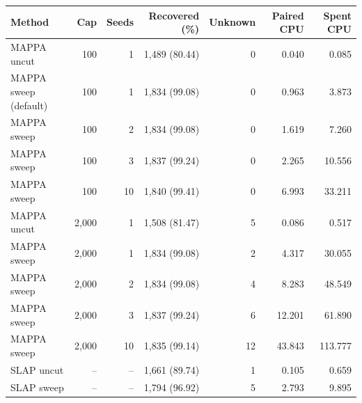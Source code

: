 \begin{tabular}{lrrr rrr}\toprule
Method & Cap & Seeds & Recovered (\%) & Unknown & Paired CPU & Spent CPU\\\midrule
MAPPA uncut & 100 & 1 & 1,489 (80.44) & 0 & 0.040 & 0.085\\
MAPPA sweep (default) & 100 & 1 & 1,834 (99.08) & 0 & 0.963 & 3.873\\
MAPPA sweep & 100 & 2 & 1,834 (99.08) & 0 & 1.619 & 7.260\\
MAPPA sweep & 100 & 3 & 1,837 (99.24) & 0 & 2.265 & 10.556\\
MAPPA sweep & 100 & 10 & 1,840 (99.41) & 0 & 6.993 & 33.211\\
MAPPA uncut & 2,000 & 1 & 1,508 (81.47) & 5 & 0.086 & 0.517\\
MAPPA sweep & 2,000 & 1 & 1,834 (99.08) & 2 & 4.317 & 30.055\\
MAPPA sweep & 2,000 & 2 & 1,834 (99.08) & 4 & 8.283 & 48.549\\
MAPPA sweep & 2,000 & 3 & 1,837 (99.24) & 6 & 12.201 & 61.890\\
MAPPA sweep & 2,000 & 10 & 1,835 (99.14) & 12 & 43.843 & 113.777\\
SLAP uncut & -- & -- & 1,661 (89.74) & 1 & 0.105 & 0.659\\
SLAP sweep & -- & -- & 1,794 (96.92) & 5 & 2.793 & 9.895\\
\bottomrule\end{tabular}
